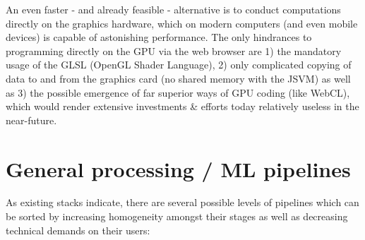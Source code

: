 An even faster - and already feasible - alternative is to conduct computations directly on the graphics hardware, which on modern computers (and even mobile devices) is capable of astonishing performance. The only hindrances to programming directly on the GPU via the web browser are 1) the mandatory usage of the GLSL (OpenGL Shader Language), 2) only complicated copying of data to and from the graphics card (no shared memory with the JSVM) as well as 3) the possible emergence of far superior ways of GPU coding (like WebCL), which would render extensive investments \& efforts today relatively useless in the near-future.


\section{General processing / ML pipelines}
\label{sect:pipelines}

As existing stacks indicate, there are several possible levels of pipelines which can be sorted by increasing homogeneity amongst their stages as well as decreasing technical demands on their users:

